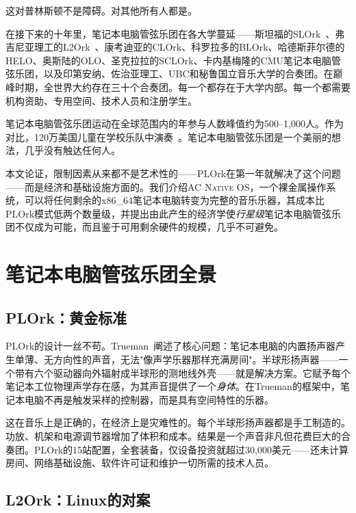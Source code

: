 \documentclass[10pt,letterpaper,twocolumn]{article}
\newcommand{\acos}{\textsc{AC Native OS}}
\begin{document}
这对普林斯顿不是障碍。对其他所有人都是。

在接下来的十年里，笔记本电脑管弦乐团在各大学蔓延——斯坦福的SLOrk~\citep{wang2009designing}、弗吉尼亚理工的L2Ork~\citep{bukvic2010l2ork}、康考迪亚的CLOrk、科罗拉多的BLOrk、哈德斯菲尔德的HELO、奥斯陆的OLO、圣克拉拉的SCLOrk、卡内基梅隆的CMU笔记本电脑管弦乐团，以及印第安纳、佐治亚理工、UBC和秘鲁国立音乐大学的合奏团。在巅峰时期，全世界大约存在三十个合奏团。每一个都存在于大学内部。每一个都需要机构资助、专用空间、技术人员和注册学生。

笔记本电脑管弦乐团运动在全球范围内的年参与人数峰值约为500--1,000人。作为对比，120万美国儿童在学校乐队中演奏~\citep{warschauer2004technology}。笔记本电脑管弦乐团是一个美丽的想法，几乎没有触达任何人。

本文论证，限制因素从来都不是艺术性的——PLOrk在第一年就解决了这个问题——而是经济和基础设施方面的。我们介绍\acos{}，一个裸金属操作系统，可以将任何剩余的x86\_64笔记本电脑转变为完整的音乐乐器，其成本比PLOrk模式低两个数量级，并提出由此产生的经济学使\emph{行星级}笔记本电脑管弦乐团不仅成为可能，而且鉴于可用剩余硬件的规模，几乎不可避免。


\section{笔记本电脑管弦乐团全景}
\label{sec:landscape}

\subsection{PLOrk：黄金标准}

PLOrk的设计一丝不苟。Trueman~\citep{trueman2007why}阐述了核心问题：笔记本电脑的内置扬声器产生单薄、无方向性的声音，无法"像声学乐器那样充满房间"。半球形扬声器——一个带有六个驱动器向外辐射成半球形的测地线外壳——就是解决方案。它赋予每个笔记本工位物理声学存在感，为其声音提供了一个\emph{身体}。在Trueman的框架中，笔记本电脑不再是触发采样的控制器，而是具有空间特性的乐器。

这在音乐上是正确的，在经济上是灾难性的。每个半球形扬声器都是手工制造的。功放、机架和电源调节器增加了体积和成本。结果是一个声音非凡但花费巨大的合奏团。PLOrk的15站配置，全套装备，仅设备投资就超过30,000美元——还未计算房间、网络基础设施、软件许可证和维护一切所需的技术人员。

\subsection{L2Ork：Linux的对案}
\end{document}

